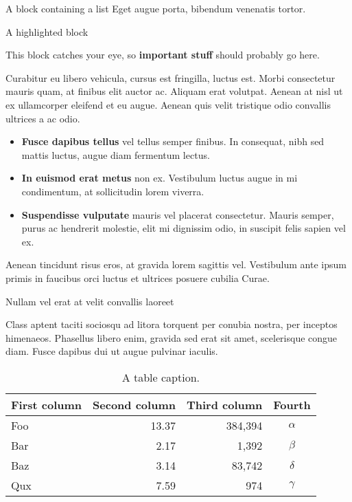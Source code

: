 \documentclass[final]{beamer}
\newlength{\colwidth}
\begin{document}
\begin{frame}[t]
\begin{columns}[t]
\begin{column}{\colwidth}
\begin{block}{A block containing a list}
    Eget augue porta, bibendum venenatis tortor.

  \end{block}

  \begin{alertblock}{A highlighted block}

    This block catches your eye, so \textbf{important stuff} should probably go
    here.

    Curabitur eu libero vehicula, cursus est fringilla, luctus est. Morbi
    consectetur mauris quam, at finibus elit auctor ac. Aliquam erat volutpat.
    Aenean at nisl ut ex ullamcorper eleifend et eu augue. Aenean quis velit
    tristique odio convallis ultrices a ac odio.

    \begin{itemize}
      \item \textbf{Fusce dapibus tellus} vel tellus semper finibus. In
        consequat, nibh sed mattis luctus, augue diam fermentum lectus.
      \item \textbf{In euismod erat metus} non ex. Vestibulum luctus augue in
        mi condimentum, at sollicitudin lorem viverra.
      \item \textbf{Suspendisse vulputate} mauris vel placerat consectetur.
        Mauris semper, purus ac hendrerit molestie, elit mi dignissim odio, in
        suscipit felis sapien vel ex.
    \end{itemize}

    Aenean tincidunt risus eros, at gravida lorem sagittis vel. Vestibulum ante
    ipsum primis in faucibus orci luctus et ultrices posuere cubilia Curae.

  \end{alertblock}

 \begin{block}{Nullam vel erat at velit convallis laoreet}

    Class aptent taciti sociosqu ad litora torquent per conubia nostra, per
    inceptos himenaeos. Phasellus libero enim, gravida sed erat sit amet,
    scelerisque congue diam. Fusce dapibus dui ut augue pulvinar iaculis.

    \begin{table}
      \centering
      \begin{tabular}{l r r c}
        \toprule
        \textbf{First column} & \textbf{Second column} & \textbf{Third column} & \textbf{Fourth} \\
        \midrule
        Foo & 13.37 & 384,394 & $\alpha$ \\
        Bar & 2.17 & 1,392 & $\beta$ \\
        Baz & 3.14 & 83,742 & $\delta$ \\
        Qux & 7.59 & 974 & $\gamma$ \\
        \bottomrule
      \end{tabular}
      \caption{A table caption.}
    \end{table}


\end{block}
\end{column}
\end{columns}
\end{frame}
\end{document}

